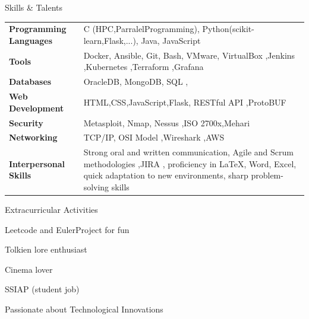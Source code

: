 \documentclass{resume}
\begin{document}
\begin{rSection}{Skills \& Talents}
    \vspace{-0.25em}
    \begin{tabularx}{\textwidth}{ @{} >{\bfseries}l @{\hspace{3ex}} X @{} }
    Programming Languages & C (HPC,ParralelProgramming), Python(scikit-learn,Flask,...), Java, JavaScript \\
    
    Tools & Docker, Ansible, Git, Bash, VMware, VirtualBox ,Jenkins ,Kubernetes ,Terraform ,Grafana\\
    
    Databases & OracleDB, MongoDB, SQL ,\\
    
    Web Development & HTML,CSS,JavaScript,Flask, RESTful API ,ProtoBUF \\
    
    Security & Metasploit, Nmap, Nessus ,ISO 2700x,Mehari\\
    
    Networking & TCP/IP, OSI Model ,Wireshark ,AWS\\
    
    Interpersonal Skills & Strong oral and written communication, Agile and Scrum methodologies ,JIRA , proficiency in LaTeX, Word, Excel, quick adaptation to new environments, sharp problem-solving skills \\
    
    \end{tabularx}
\end{rSection}
\vspace{-0.75em}
\begin{rSection}{Extracurricular Activities} 
    \vspace{-0.25em}
    \begin{enumerate*}
        \item Leetcode and EulerProject for fun
        \item Tolkien lore enthusiast
        \item Cinema lover
        \item SSIAP (student job)
        \item Passionate about Technological Innovations
    \end{enumerate*}
\end{rSection}

\end{document}
